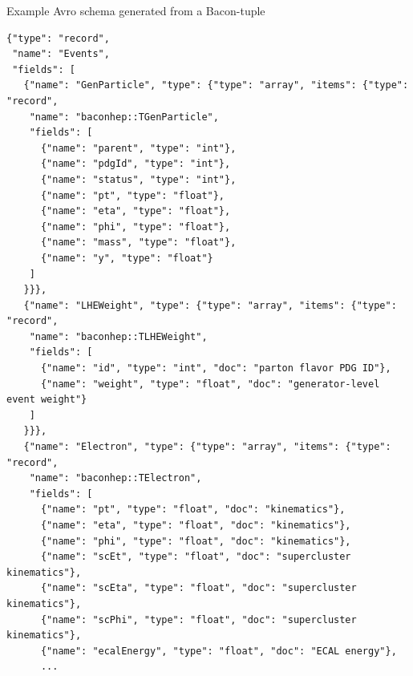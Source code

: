 \documentclass{beamer}
\begin{document}
\begin{frame}[fragile]{Example Avro schema generated from a Bacon-tuple}
\tiny
\begin{verbatim}
{"type": "record",
 "name": "Events",
 "fields": [
   {"name": "GenParticle", "type": {"type": "array", "items": {"type": "record",
    "name": "baconhep::TGenParticle",
    "fields": [
      {"name": "parent", "type": "int"},
      {"name": "pdgId", "type": "int"},
      {"name": "status", "type": "int"},
      {"name": "pt", "type": "float"},
      {"name": "eta", "type": "float"},
      {"name": "phi", "type": "float"},
      {"name": "mass", "type": "float"},
      {"name": "y", "type": "float"}
    ]
   }}},
   {"name": "LHEWeight", "type": {"type": "array", "items": {"type": "record",
    "name": "baconhep::TLHEWeight",
    "fields": [
      {"name": "id", "type": "int", "doc": "parton flavor PDG ID"},
      {"name": "weight", "type": "float", "doc": "generator-level event weight"}
    ]
   }}},
   {"name": "Electron", "type": {"type": "array", "items": {"type": "record",
    "name": "baconhep::TElectron",
    "fields": [
      {"name": "pt", "type": "float", "doc": "kinematics"},
      {"name": "eta", "type": "float", "doc": "kinematics"},
      {"name": "phi", "type": "float", "doc": "kinematics"},
      {"name": "scEt", "type": "float", "doc": "supercluster kinematics"},
      {"name": "scEta", "type": "float", "doc": "supercluster kinematics"},
      {"name": "scPhi", "type": "float", "doc": "supercluster kinematics"},
      {"name": "ecalEnergy", "type": "float", "doc": "ECAL energy"},
      ...
\end{verbatim}
\end{frame}
\end{document}
